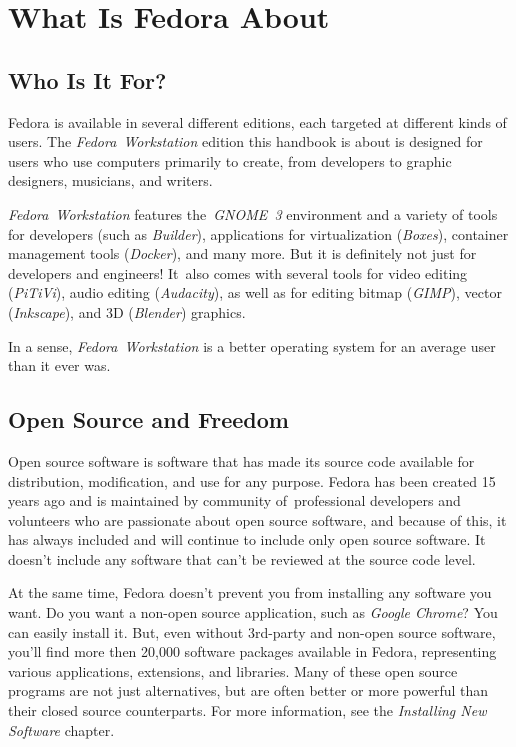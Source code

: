 \chapter*{What Is Fedora About}
\section*{Who Is It For?}

Fedora is available in several different editions, each targeted at different kinds of users. The \emph{Fedora~Workstation} edition this handbook is about is designed for users who use computers primarily to create, from developers to graphic designers, musicians, and writers.

\emph{Fedora~Workstation} features the~\emph{GNOME~3} environment and a variety of tools for developers (such as \emph{Builder}), applications for virtualization (\emph{Boxes}), container management tools (\emph{Docker}), and many more. But it is definitely not just for developers and engineers! It~also comes with several tools for video editing (\emph{PiTiVi}), audio editing (\emph{Audacity}), as well as for editing bitmap (\emph{GIMP}), vector (\emph{Inkscape}), and 3D (\emph{Blender}) graphics.

In a sense, \emph{Fedora~Workstation} is a better operating system for an average user than it ever was.

\section*{Open Source and Freedom}

Open source software is software that has made its source code available for distribution, modification, and use for any purpose. Fedora has been created 15 years ago and is maintained by community of~professional developers and volunteers who are passionate about open source software, and because of this, it has always included and will continue to include only open source software. It doesn’t include any software that can’t be reviewed at the source code level.

At the same time, Fedora doesn't prevent you from installing any software you want. Do you want a non-open source application, such as \emph{Google Chrome}? You can easily install it. But, even without 3rd-party and non-open source software, you'll find more then 20,000 software packages available in Fedora, representing various applications, extensions, and libraries. Many of these open source programs are not just alternatives, but are often better or more powerful than their closed source counterparts. For more information, see the \emph{Installing New Software} chapter. %

